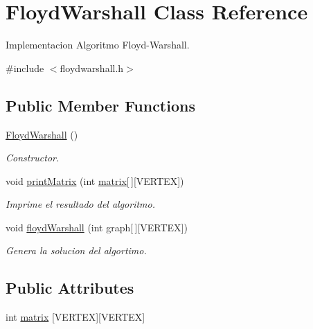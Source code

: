 \hypertarget{classFloydWarshall}{}\section{Floyd\+Warshall Class Reference}
\label{classFloydWarshall}


Implementacion Algoritmo Floyd-\/\+Warshall.  




{\ttfamily \#include $<$floydwarshall.\+h$>$}

\subsection*{Public Member Functions}
\begin{DoxyCompactItemize}
\item 
\mbox{\label{classFloydWarshall_a389140068c03fe74d3e8b01721a1681b}} 
\hyperlink{classFloydWarshall_a389140068c03fe74d3e8b01721a1681b}{Floyd\+Warshall} ()
\begin{DoxyCompactList}\small\item\em Constructor. \end{DoxyCompactList}\item 
void \hyperlink{classFloydWarshall_aef3b3e3377992e6c4e7af01a64e710d7}{print\+Matrix} (int \hyperlink{classFloydWarshall_a391d930a37f05729d69d27374e715c33}{matrix}\mbox{[}$\,$\mbox{]}\mbox{[}V\+E\+R\+T\+EX\mbox{]})
\begin{DoxyCompactList}\small\item\em Imprime el resultado del algoritmo. \end{DoxyCompactList}\item 
void \hyperlink{classFloydWarshall_a75a05e1f9ae7d6edc9c7efeffe19ac74}{floyd\+Warshall} (int graph\mbox{[}$\,$\mbox{]}\mbox{[}V\+E\+R\+T\+EX\mbox{]})
\begin{DoxyCompactList}\small\item\em Genera la solucion del algortimo. \end{DoxyCompactList}\end{DoxyCompactItemize}
\subsection*{Public Attributes}
\begin{DoxyCompactItemize}
\item 
int \hyperlink{classFloydWarshall_a391d930a37f05729d69d27374e715c33}{matrix} \mbox{[}V\+E\+R\+T\+EX\mbox{]}\mbox{[}V\+E\+R\+T\+EX\mbox{]}
\end{DoxyCompactItemize}



